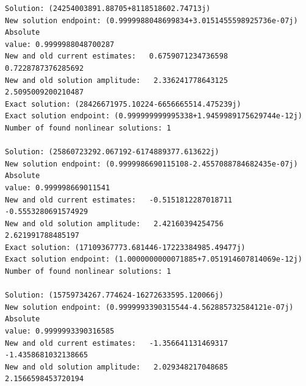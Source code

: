 \documentclass[11pt]{article}
\begin{document}
\begin{Verbatim}[commandchars=\\\{\}]
Solution: (24254003891.88705+8118518602.74713j)
New solution endpoint: (0.9999988048699834+3.0151455598925736e-07j) Absolute
value: 0.9999988048700287
New and old current estimates:   0.6759071234736598    0.7228787376285692
New and old solution amplitude:   2.336241778643125    2.5095009200210487
Exact solution: (28426671975.10224-6656665514.475239j)
Exact solution endpoint: (0.999999999995338+1.9459989175629744e-12j)
Number of found nonlinear solutions: 1

Solution: (25860723292.067192-6174889377.613622j)
New solution endpoint: (0.9999986690115108-2.4557088784682435e-07j) Absolute
value: 0.999998669011541
New and old current estimates:   -0.5151812287018711    -0.5553280691574929
New and old solution amplitude:   2.42160394254756    2.621991788485197
Exact solution: (17109367773.681446-17223384985.49477j)
Exact solution endpoint: (1.0000000000071885+7.051914607814069e-12j)
Number of found nonlinear solutions: 1

Solution: (15759734267.774624-16272633595.120066j)
New solution endpoint: (0.9999993390315544-4.562885732584121e-07j) Absolute
value: 0.9999993390316585
New and old current estimates:   -1.356641131469317    -1.4358681032138665
New and old solution amplitude:   2.029348217048685    2.1566598453720194
    \end{Verbatim}


    
    
    
\end{document}
